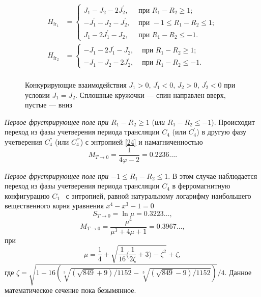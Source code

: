 \[
\begin{aligned}
H_{\text{fr}_1}&=
\begin{cases}
J_{1}-J_2-2J_{2}^{'}, & \text{ при } R_1-R_2\ge 1; \\
-J_{1}^{'}-J_2-J_{2}^{'}, & \text{ при } -1\leq R_1-R_2\leq 1; \\
J_1-2J_{1}^{'}-J_{2},   & \text{ при }  R_1-R_2\leq  -1.
\end{cases}\\
H_{\text{fr}_2}&=
\begin{cases}
-J_1-2J_1^{'}-J_2, & \text{ при } R_1-R_2\ge 1; \\
-J_1-J_2-2J_2^{'},   & \text{ при }  R_1-R_2\leq -1.
\end{cases}\\
\end{aligned}
\]

 \begin{figure}[h]
 	\caption{Конкурирующие взаимодействия $J_1 > 0$, $J_1^{'} < 0$, $J_2 > 0$, $J_2^{'} < 0$ при условии $J_1 = J_2$. Сплошные кружочки --- спин направлен вверх, пустые --- вниз}
 	\label{transGenChain4}
 \end{figure}

\emph{Первое фрустрирующее поле при $R_1 - R_2 \geqslant 1$} (\emph{или $R_1 - R_2 \leqslant -1$}). Происходит переход из фазы учетверения периода трансляции $C_4$ (или $C_4^{'}$) в другую фазу учетверения $C_4^{''}$ (или $C_4^{'''}$) с энтропией \eqref{24} и намагниченностью
\begin{equation}
M_{T\rightarrow 0} = \frac{1}{4\varphi - 2} = 0.2236\dots.
\label{34}
\end{equation}

\emph{Первое фрустрирующее поле при $-1 \leqslant R_1 - R_2 \leqslant 1$}. В этом случае наблюдается переход из фазы учетверения периода трансляции $C_4$ в ферромагнитную конфигурацию $C_1$~\cite{zarubin2019} с энтропией, равной натуральному логарифму наибольшего вещественного корня уравнения $x^4-x^3-1=0$
\begin{equation}
S_{T\rightarrow 0} = \ln \mu = 0.3223\dots,
\label{35}
\end{equation}
\begin{equation}
M_{T\rightarrow 0} = \frac{\mu^4}{\mu^3+4\mu+1} = 0.3967\dots,
\label{36}
\end{equation}
при 
\begin{equation*}
\mu = \frac{1}{4} + \sqrt{\frac{1}{16}\bigg(\frac{1}{2\zeta} + 3\bigg) - \zeta^2} + \zeta ,
\end{equation*}
где $\zeta = \sqrt{1-16\left(\sqrt[3]{(\sqrt{849}+9)/1152}-\sqrt[3]{(\sqrt{849}-9)/1152}\right)}/4$.
Данное математическое сечение пока безымянное.


